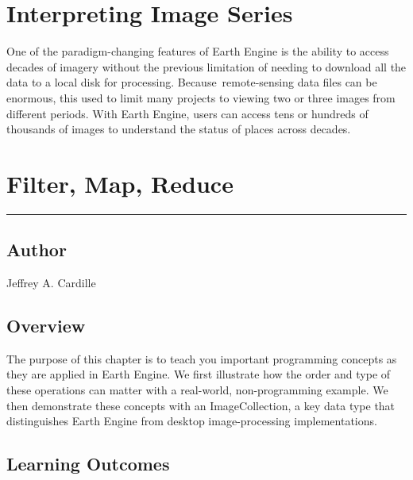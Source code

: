 \documentclass[
  letterpaper,
  DIV=11,
  numbers=noendperiod]{scrreprt}
\begin{document}
\hypertarget{interpreting-image-series}{%
\chapter{Interpreting Image Series}\label{interpreting-image-series}}

One of the paradigm-changing features of Earth Engine is the ability to
access decades of imagery without the previous limitation of needing to
download all the data to a local disk for processing.
Because~remote-sensing data files can be enormous, this used to limit
many projects to viewing two or three images from different periods.
With Earth Engine, users can access tens or hundreds of thousands of
images to understand the status of places across decades.

\hypertarget{filter-map-reduce}{%
\chapter{Filter, Map, Reduce}\label{filter-map-reduce}}

\begin{center}\rule{0.5\linewidth}{0.5pt}\end{center}

\hypertarget{author-5}{%
\section*{Author}\label{author-5}}


Jeffrey A. Cardille

\hypertarget{overview-7}{%
\section*{Overview}\label{overview-7}}


The purpose of this chapter is to teach you important programming
concepts as they are applied in Earth Engine. We first illustrate how
the order and type of these operations can matter with a real-world,
non-programming example. We then demonstrate these concepts with an
ImageCollection, a key data type that distinguishes Earth Engine from
desktop image-processing implementations.

\hypertarget{learning-outcomes-7}{%
\section*{Learning Outcomes}\label{learning-outcomes-7}}
\end{document}
